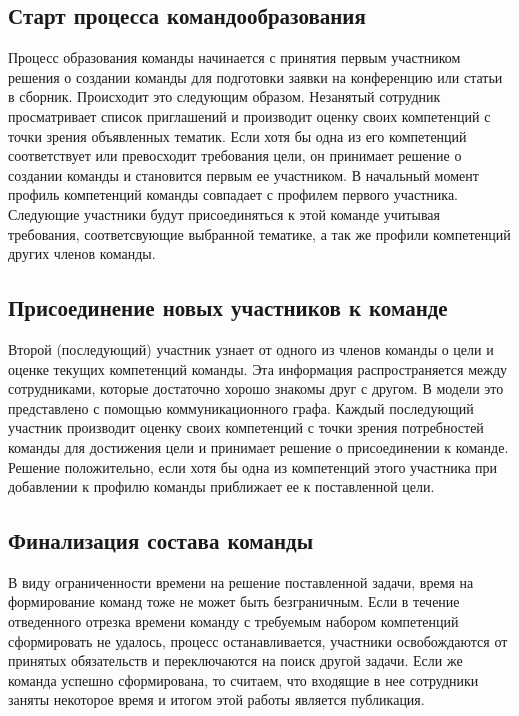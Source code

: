 \subsection{Старт процесса командообразования}

Процесс образования команды начинается с принятия первым участником решения о создании команды для подготовки заявки на конференцию или статьи в сборник.
Происходит это следующим образом. 
Незанятый сотрудник просматривает список приглашений и производит оценку своих компетенций с точки зрения объявленных тематик. 
Если хотя бы одна из его компетенций соответствует или превосходит требования цели, он принимает решение о создании команды и становится первым ее участником.
В начальный момент профиль компетенций команды совпадает с профилем первого участника.
Следующие участники будут присоединяться к этой команде учитывая  требования, соответсвующие выбранной тематике, а так же профили компетенций других членов команды. 

\subsection{Присоединение новых участников к команде}

Второй (последующий) участник узнает от одного из членов команды о цели и оценке текущих компетенций команды. 
Эта информация распространяется между сотрудниками, которые достаточно хорошо знакомы друг с другом. 
В модели это представлено с помощью коммуникационного графа. 
Каждый последующий участник производит оценку своих компетенций с точки зрения потребностей команды для достижения цели и принимает решение о присоединении к команде. 
Решение положительно, если хотя бы одна из компетенций этого участника при добавлении к профилю команды приближает ее к поставленной цели.

\subsection{Финализация состава команды}

В виду ограниченности  времени на решение поставленной задачи, время на формирование команд тоже не может быть безграничным.
Если в течение отведенного отрезка времени команду с требуемым набором компетенций сформировать не удалось, процесс останавливается, участники освобождаются от принятых обязательств и переключаются на поиск другой задачи. 
Если же команда успешно сформирована, то считаем, что входящие в нее сотрудники заняты некоторое время и итогом этой работы является публикация.


